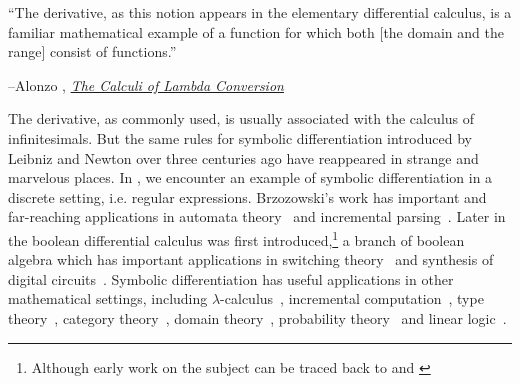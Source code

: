 
\vspace{2pt}\setlength{\epigraphwidth}{0.65\textwidth}
\epigraph{``The derivative, as this notion appears in the elementary differential calculus, is a familiar mathematical example of a function for which both [the domain and the range] consist of functions.''}{\begin{flushright}--Alonzo \citet{church1941calculi}, \href{https://archive.org/details/AnnalsOfMathematicalStudies6ChurchAlonzoTheCalculiOfLambdaConversionPrincetonUniversityPress1941}{\textit{The Calculi of Lambda Conversion}}\end{flushright}}

The derivative, as commonly used, is usually associated with the calculus of infinitesimals. But the same rules for symbolic differentiation introduced by Leibniz and Newton over three centuries ago have reappeared in strange and marvelous places. In \citet{brzozowski1964derivatives}, we encounter an example of symbolic differentiation in a discrete setting, i.e. regular expressions. Brzozowski's work has important and far-reaching applications in automata theory~\citep{berry1986regex, antimirov1996partial, champarnaud1999regular} and incremental parsing~\citep{might2011parsing, moss2014derivatives}. Later in \citet{thayse1981boolean} the boolean differential calculus was first introduced,\hspace{-.08em}\footnote{Although early work on the subject can be traced back to \citet{talantsev1959analysis} and \citet{sellers1968analyzing}} a branch of boolean algebra which has important applications in switching theory~\citep{thayse1973boolean} and synthesis of digital circuits~\citep{steinbach2017boolean}. Symbolic differentiation has useful applications in other mathematical settings, including $\lambda$-calculus~\citep{ehrhard2003differential, cai2014theory, kelly2016evolving, brunel2020backpropagation}, incremental computation~\citep{alvarez2019fixing, alvarez2019change}, type theory~\citep{mcbride2001derivative, mcbride2008clowns, chen2012type}, category theory~\citep{blute2006differential, blute2009cartesian}, domain theory~\citep{edalat2002domain}, probability theory~\citep{kac1951probability} and linear logic~\citep{ehrhard2018introduction, clift2018derivatives}.

